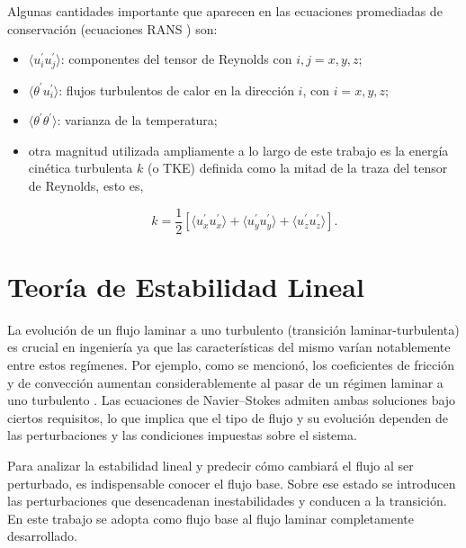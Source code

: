 Algunas cantidades importante que aparecen en las ecuaciones promediadas de conservación (ecuaciones RANS \cite{kundu}) son:

\begin{itemize}
	\item $\langle u^{\prime}_i u^{\prime}_j \rangle$: componentes del tensor de Reynolds con $i,j=x,y,z$;
	\item $\langle \theta^{\prime} u^{\prime}_i \rangle$: flujos turbulentos de calor en la dirección $i$, con $i=x,y,z$;
	\item $\langle \theta^{\prime} \theta^{\prime} \rangle$: varianza de la temperatura;

	\item otra magnitud utilizada ampliamente a lo largo de este trabajo es la energía cinética turbulenta $k$ (o TKE) definida como la mitad de la traza del tensor de Reynolds, esto es, 

\begin{equation}
k = \frac{1}{2} \left[ \langle u^{\prime}_x u^{\prime}_x \rangle + \langle u^{\prime}_y u^{\prime}_y \rangle + \langle u^{\prime}_z u^{\prime}_z \rangle \right] \text{.}
\label{eq:tke}
\end{equation}

\end{itemize}


\section{Teoría de Estabilidad Lineal} \label{line_an}

La evolución de un flujo laminar a uno turbulento (transición laminar-turbulenta) es crucial en ingeniería ya que las características del mismo varían notablemente entre estos regímenes. Por ejemplo, como se mencionó, los coeficientes de fricción y de convección aumentan considerablemente al pasar de un régimen laminar a uno turbulento \cite{machaca2024}. Las ecuaciones de Navier–Stokes admiten ambas soluciones bajo ciertos requisitos, lo que implica que el tipo de flujo y su evolución dependen de las perturbaciones y las condiciones impuestas sobre el sistema. 

Para analizar la estabilidad lineal y predecir cómo cambiará el flujo al ser perturbado, es indispensable conocer el flujo base. Sobre ese estado se introducen las perturbaciones que desencadenan inestabilidades y conducen a la transición. En este trabajo se adopta como flujo base al flujo laminar completamente desarrollado. 


